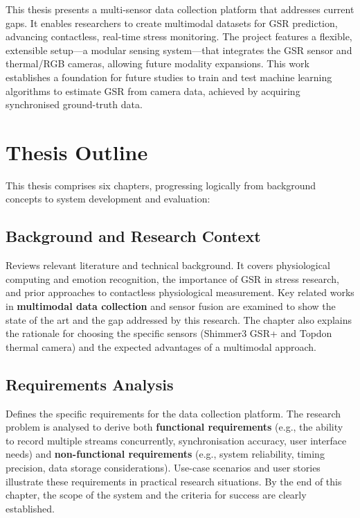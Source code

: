 This thesis presents a multi-sensor data collection platform that addresses current gaps. It enables researchers to create multimodal datasets for GSR prediction, advancing contactless, real-time stress monitoring. The project features a flexible, extensible setup---a modular sensing system---that integrates the GSR sensor and thermal/RGB cameras, allowing future modality expansions. This work establishes a foundation for future studies to train and test machine learning algorithms to estimate GSR from camera data, achieved by acquiring synchronised ground-truth data.


\section{Thesis Outline}
This thesis comprises six chapters, progressing logically from background concepts to system development and evaluation:

\subsection{Background and Research Context} Reviews relevant literature and technical background. It covers physiological computing and emotion recognition, the importance of GSR in stress research, and prior approaches to contactless physiological measurement. Key related works in \textbf{multimodal data collection} and sensor fusion are examined to show the state of the art and the gap addressed by this research. The chapter also explains the rationale for choosing the specific sensors (Shimmer3 GSR+ and Topdon thermal camera) and the expected advantages of a multimodal approach.

\subsection{Requirements Analysis} Defines the specific requirements for the data collection platform. The research problem is analysed to derive both \textbf{functional requirements} (e.g., the ability to record multiple streams concurrently, synchronisation accuracy, user interface needs) and \textbf{non-functional requirements} (e.g., system reliability, timing precision, data storage considerations). Use-case scenarios and user stories illustrate these requirements in practical research situations. By the end of this chapter, the scope of the system and the criteria for success are clearly established.

